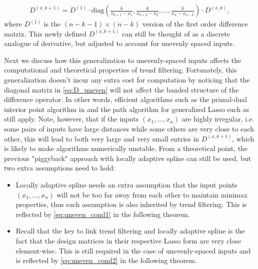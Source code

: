 \documentclass[a4paper]{article}
\begin{document}
\begin{align}
D^{(x,k+1)} = D^{(1)} \cdot \mbox{diag}(\frac{k}{x_{k+1}-x_1}, \frac{k}{x_{k+2} - x_2}, \ldots, \frac{k}{x_n-x_{n-k}}) \cdot D^{(x,k)},
\label{eq:D_uneven}
\end{align}
where $D^{(1)}$ is the $(n-k-1) \times (n-k)$ version of the first order difference matrix. This newly defined $D^{(x, k+1)}$ can still be thought of as a discrete analogue of derivative, but adjusted to account for unevenly spaced inputs.

Next we discuss how this generalization to unevenly-spaced inputs affects the computational and theoretical properties of trend filtering. Fortunately, this generalization doesn't incur any extra cost for computation by noticing that the diagonal matrix in \eqref{eq:D_uneven} will not affect the banded structure of the difference operator. In other words, efficient algorithms such as the primal-dual interior point algorithm in \cite{kim2009ell_1} and the path algorithm for generalized Lasso such as \cite{harchaoui2010multiple,tibshirani2011solution} still apply. Note, however, that if the inputs $(x_1,\ldots, x_n)$ are highly irregular, i.e. some pairs of inputs have large distances while some others are very close to each other, this will lead to both very large and very small entries in $D^{(x,k+1)}$, which is likely to make algorithms numerically unstable. From a theoretical point, the previous "piggyback" approach with locally adaptive spline can still be used, but two extra assumptions need to hold: 

\begin{itemize}
\item Locally adaptive spline needs an extra assumption that the input points $(x_1,\ldots, x_n)$ will not be too far away from each other to maintain minimax properties, thus such assumption is also inherited by trend filtering. This is reflected by \eqref{eq:uneven_cond1} in the following theorem.
\item Recall that the key to link trend filtering and locally adaptive spline is the fact that the design matrices in their respective Lasso form are very close element-wise. This is still required in the case of unevenly-spaced inputs and is reflected by \eqref{eq:uneven_cond2} in the following theorem.
\end{itemize}
\end{document}
